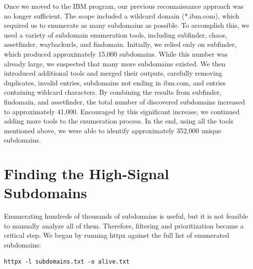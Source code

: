 \documentclass[12pt,a4paper]{report}
\begin{document}
Once we moved to the IBM program, our previous reconnaissance approach was no longer sufficient. The scope included a wildcard domain (*.ibm.com), which required us to enumerate as many subdomains as possible.
To accomplish this, we used a variety of subdomain enumeration tools, including subfinder, chaos, assetfinder, waybackurls, and findomain. Initially, we relied only on subfinder, which produced approximately 15,000 subdomains. While this number was already large, we suspected that many more subdomains existed.
We then introduced additional tools and merged their outputs, carefully removing duplicates, invalid entries, subdomains not ending in ibm.com, and entries containing wildcard characters. By combining the results from subfinder, findomain, and assetfinder, the total number of discovered subdomains increased to approximately 41,000.
Encouraged by this significant increase, we continued adding more tools to the enumeration process. In the end, using all the tools mentioned above, we were able to identify approximately 352,000 unique subdomains.

\section{Finding the High-Signal Subdomains}

Enumerating hundreds of thousands of subdomains is useful, but it is not feasible to manually analyze all of them. Therefore, filtering and prioritization became a critical step.
We began by running httpx against the full list of enumerated subdomains:

\begin{lstlisting}[style=bash]
httpx -l subdomains.txt -o alive.txt
\end{lstlisting}
\end{document}
